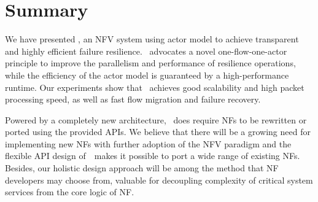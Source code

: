 \section{Summary}
\label{sec:conclusion}

We have presented \nfactor, an NFV system using actor model to achieve transparent and highly efficient failure resilience. \nfactor~advocates a novel one-flow-one-actor principle to improve the parallelism and performance of resilience operations, while the efficiency of the actor model is guaranteed by a high-performance runtime. Our experiments show that \nfactor~achieves good scalability and high packet processing speed, as well as fast flow migration and failure recovery.

Powered by a completely new architecture, \nfactor~does require NFs to be rewritten or ported using the provided APIs. We believe that there will be a growing need for implementing new NFs with further adoption of the NFV paradigm and the flexible API design of~\nfactor~makes it possible to port a wide range of existing NFs. Besides, our holistic design approach will be among the method that NF developers may choose from, valuable for decoupling complexity of critical system services from the core logic of NF. %


